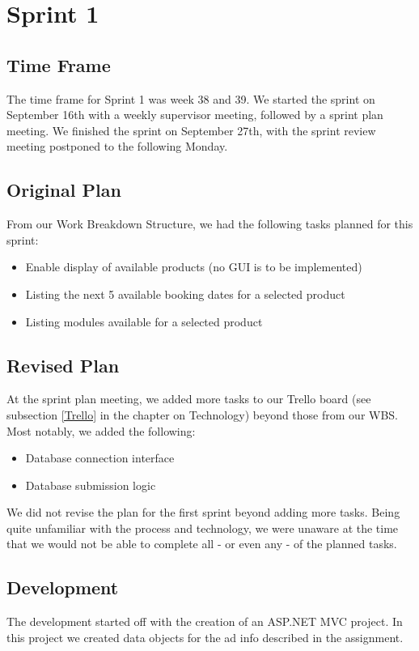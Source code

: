 \chapter{Sprint 1}

\section{Time Frame}
The time frame for Sprint 1 was week 38 and 39. We started the sprint on September 16th with a weekly supervisor meeting, followed by a sprint plan meeting. We finished the sprint on September 27th, with the sprint review meeting postponed to the following Monday.

\section{Original Plan}
From our Work Breakdown Structure, we had the following tasks planned for this sprint:
\begin{itemize}
	\item Enable display of available products (no GUI is to be implemented)
	\item Listing the next 5 available booking dates for a selected product
	\item Listing modules available for a selected product
\end{itemize}

\section{Revised Plan}
At the sprint plan meeting, we added more tasks to our Trello board (see subsection \ref{Trello} in the chapter on Technology) beyond those from our WBS. Most notably, we added the following:
\begin{itemize}
	\item Database connection interface
	\item Database submission logic
\end{itemize}

We did not revise the plan for the first sprint beyond adding more tasks. Being quite unfamiliar with the process and technology, we were unaware at the time that we would not be able to complete all - or even any - of the planned tasks.

\section{Development}
The development started off with the creation of an ASP.NET MVC project. In this project we created data objects for the ad info described in the assignment.

